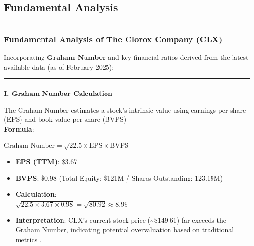 \documentclass[
  letterpaper,
  DIV=11,
  numbers=noendperiod]{scrartcl}
\makeatletter
\let\oldparagraph\paragraph
\renewcommand{\paragraph}{
    \@ifstar
      \xxxParagraphStar
      \xxxParagraphNoStar
  }
\newcommand{\xxxParagraphStar}[1]{\oldparagraph*{#1}\mbox{}}
\newcommand{\xxxParagraphNoStar}[1]{\oldparagraph{#1}\mbox{}}
\providecommand{\tightlist}{%
  \setlength{\itemsep}{0pt}\setlength{\parskip}{0pt}}\usepackage{longtable,booktabs,array}
\makeatother
\begin{document}
\subsection{Fundamental Analysis}\label{fundamental-analysis}

\section{}\label{section-3}

\subsubsection{Fundamental Analysis of The Clorox Company
(CLX)}\label{fundamental-analysis-of-the-clorox-company-clx}

Incorporating \textbf{Graham Number} and key financial ratios derived
from the latest available data (as of February 2025):

\begin{center}\rule{0.5\linewidth}{0.5pt}\end{center}

\paragraph{\texorpdfstring{\textbf{I. Graham Number
Calculation}}{I. Graham Number Calculation}}\label{i.-graham-number-calculation}

The Graham Number estimates a stock's intrinsic value using earnings per
share (EPS) and book value per share (BVPS):\\
\textbf{Formula}:

\(\text{Graham Number} = \sqrt{22.5 \times \text{EPS} \times \text{BVPS}}\)

\begin{itemize}
\tightlist
\item
  \textbf{EPS (TTM)}: \$3.67\\
\item
  \textbf{BVPS}: \$0.98 (Total Equity: \$121M / Shares Outstanding:
  123.19M)\\
\item
  \textbf{Calculation}:\\
  \(\sqrt{22.5 \times 3.67 \times 0.98} = \sqrt{80.92} \approx \boxed{8.99}\)
\item
  \textbf{Interpretation}: CLX's current stock price
  (\textasciitilde\$149.61) far exceeds the Graham Number, indicating
  potential overvaluation based on traditional metrics .
\end{itemize}
\end{document}
